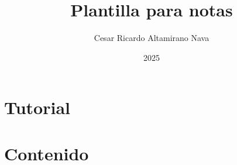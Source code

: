 \documentclass[A4,12pt]{book}
\begin{document}
	\author{Cesar Ricardo Altamirano Nava}
	\title{Plantilla para notas}
	\date{2025}
	\frontmatter
	\maketitle
	\tableofcontents
	\newpage
	\listoffigures
    
        
        \mainmatter
        \part{Tutorial}
	
        \part{Contenido}
        
	\backmatter
        \nocite{*}
	\printbibliography[title={Bibliografía},heading=bibintoc]
\end{document}
